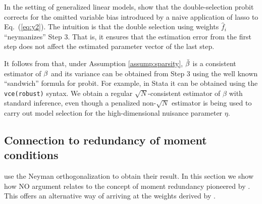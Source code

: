 \documentclass[11pt]{article}
\begin{document}
In the setting of generalized linear models, \cite{bellonichernozhukovwei2016} show that the double-selection probit corrects for the omitted variable bias introduced by a naive application of lasso to Eq.~(\ref{eq:y2}). The intuition is that the double selection using weights $\hat{f}_i$ ``neymanizes'' Step 3. That is, it ensures that the estimation error from the first step does not affect the estimated parameter vector of the last step. 

It follows from \citet[][Theorem 1]{bellonichernozhukovwei2016} that, under Assumption \ref{assump:sparsity}, 
$\check{\mathbf{\beta}}$ is a consistent estimator of  $\mathbf{\beta}$ and its variance can be obtained from Step 3 using the well known ``sandwich'' formula for probit. For example, in Stata it can be obtained using the \texttt{vce(robust)} syntax. We obtain a regular $\sqrt{N}$-consistent estimator of $\beta$ with standard inference, even though a penalized non-$\sqrt{N}$ estimator is being used to carry out model selection for the high-dimensional nuisance parameter $\eta$.




	\subsection{Connection to redundancy of moment conditions}

\cite{bellonichernozhukovwei2016} use the Neyman orthogonalization to obtain their result. In this section we show how NO argument relates to the concept of moment redundancy pioneered by \cite{breusch/etal:99}. This offers an alternative way of arriving at the weights derived by 
\cite{bellonichernozhukovwei2016}. 
\end{document}
